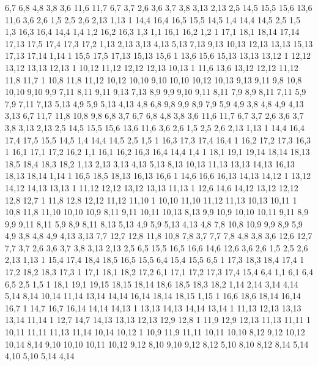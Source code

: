 6,7
6,8
4,8
3,8
%
3,6
11,6
11,7
6,7
3,7
%
2,6
3,6
3,7
3,8
3,13
2,13
%
2,5
14,5
15,5
15,6
13,6
11,6
3,6
2,6
%
1,5
2,5
2,6
2,13
1,13
1%
14,4
16,4
16,5
15,5
14,5
%
1,4
14,4
14,5
2,5
1,5
%
1,3
16,3
16,4
14,4
1,4
%
1,2
16,2
16,3
1,3
%
1,1
16,1
16,2
1,2
1%
17,1
18,1
18,14
17,14
17,13
17,5
17,4
17,3
17,2
%
1,13
2,13
3,13
4,13
5,13
7,13
9,13
10,13
12,13
13,13
15,13
17,13
17,14
1,14
1%
15,5
17,5
17,13
15,13
15,6
1%
13,6
15,6
15,13
13,13
13,12
1%
12,12
13,12
13,13
12,13
1%
10,12
11,12
12,12
12,13
10,13
1%
11,6
13,6
13,12
12,12
11,12
11,8
11,7
1%
10,8
11,8
11,12
10,12
10,10
%
9,10
10,10
10,12
10,13
9,13
9,11
%
9,8
10,8
10,10
9,10
9,9
%
7,11
8,11
9,11
9,13
7,13
%
8,9
9,9
9,10
9,11
8,11
%
7,9
8,9
8,11
7,11
%
5,9
7,9
7,11
7,13
5,13
%
4,9
5,9
5,13
4,13
%
4,8
6,8
9,8
9,9
8,9
7,9
5,9
4,9
%
3,8
4,8
4,9
4,13
3,13
%
6,7
11,7
11,8
10,8
9,8
6,8
%
3,7
6,7
6,8
4,8
3,8
%
3,6
11,6
11,7
6,7
3,7
%
2,6
3,6
3,7
3,8
3,13
2,13
%
2,5
14,5
15,5
15,6
13,6
11,6
3,6
2,6
%
1,5
2,5
2,6
2,13
1,13
1%
14,4
16,4
17,4
17,5
15,5
14,5
%
1,4
14,4
14,5
2,5
1,5
1%
16,3
17,3
17,4
16,4
1%
16,2
17,2
17,3
16,3
1%
16,1
17,1
17,2
16,2
%
1,1
16,1
16,2
16,3
16,4
14,4
1,4
1%
18,1
19,1
19,14
18,14
18,13
18,5
18,4
18,3
18,2
%
1,13
2,13
3,13
4,13
5,13
8,13
10,13
11,13
13,13
14,13
16,13
18,13
18,14
1,14
1%
16,5
18,5
18,13
16,13
16,6
1%
14,6
16,6
16,13
14,13
14,12
1%
13,12
14,12
14,13
13,13
1%
11,12
12,12
13,12
13,13
11,13
1%
12,6
14,6
14,12
13,12
12,12
12,8
12,7
1%
11,8
12,8
12,12
11,12
11,10
1%
10,10
11,10
11,12
11,13
10,13
10,11
1%
10,8
11,8
11,10
10,10
10,9
%
8,11
9,11
10,11
10,13
8,13
%
9,9
10,9
10,10
10,11
9,11
%
8,9
9,9
9,11
8,11
%
5,9
8,9
8,11
8,13
5,13
%
4,9
5,9
5,13
4,13
%
4,8
7,8
10,8
10,9
9,9
8,9
5,9
4,9
%
3,8
4,8
4,9
4,13
3,13
%
7,7
12,7
12,8
11,8
10,8
7,8
%
3,7
7,7
7,8
4,8
3,8
%
3,6
12,6
12,7
7,7
3,7
%
2,6
3,6
3,7
3,8
3,13
2,13
%
2,5
6,5
15,5
16,5
16,6
14,6
12,6
3,6
2,6
%
1,5
2,5
2,6
2,13
1,13
1%
15,4
17,4
18,4
18,5
16,5
15,5
%
6,4
15,4
15,5
6,5
1%
17,3
18,3
18,4
17,4
1%
17,2
18,2
18,3
17,3
1%
17,1
18,1
18,2
17,2
%
6,1
17,1
17,2
17,3
17,4
15,4
6,4
%
1,1
6,1
6,4
6,5
2,5
1,5
1%
18,1
19,1
19,15
18,15
18,14
18,6
18,5
18,3
18,2
%
1,14
2,14
3,14
4,14
5,14
8,14
10,14
11,14
13,14
14,14
16,14
18,14
18,15
1,15
1%
16,6
18,6
18,14
16,14
16,7
1%
14,7
16,7
16,14
14,14
14,13
1%
13,13
14,13
14,14
13,14
1%
11,13
12,13
13,13
13,14
11,14
1%
12,7
14,7
14,13
13,13
12,13
12,9
12,8
1%
11,9
12,9
12,13
11,13
11,11
1%
10,11
11,11
11,13
11,14
10,14
10,12
1%
10,9
11,9
11,11
10,11
10,10
%
8,12
9,12
10,12
10,14
8,14
%
9,10
10,10
10,11
10,12
9,12
%
8,10
9,10
9,12
8,12
%
5,10
8,10
8,12
8,14
5,14
%
4,10
5,10
5,14
4,14
%
